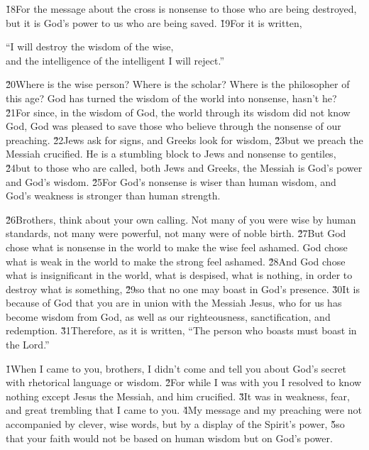 \v{18}For the message about the cross is nonsense to those who are being destroyed, but it is God's power to us who are being saved. \v{19}For it is written,

\begin{poetry}
\poeml ``I will destroy the wisdom of the wise, \\
\poemll    and the intelligence of the intelligent I will reject.''
\end{poetry}

\v{20}Where is the wise person? Where is the scholar? Where is the philosopher of this age? God has turned the wisdom of the world into nonsense, hasn't he? \v{21}For since, in the wisdom of God, the world through its wisdom did not know God, God was pleased to save those who believe through the nonsense of our preaching. \v{22}Jews ask for signs, and Greeks look for wisdom, \v{23}but we preach the Messiah crucified. He is a stumbling block to Jews and nonsense to gentiles, \v{24}but to those who are called, both Jews and Greeks, the Messiah is God's power and God's wisdom. \v{25}For God's nonsense is wiser than human wisdom, and God's weakness is stronger than human strength.

\v{26}Brothers, think about your own calling. Not many of you were wise by human standards, not many were powerful, not many were of noble birth. \v{27}But God chose what is nonsense in the world to make the wise feel ashamed. God chose what is weak in the world to make the strong feel ashamed. \v{28}And God chose what is insignificant in the world, what is despised, what is nothing, in order to destroy what is something, \v{29}so that no one may boast in God's presence. \v{30}It is because of God that you are in union with the Messiah Jesus, who for us has become wisdom from God, as well as our righteousness, sanctification, and redemption. \v{31}Therefore, as it is written, ``The person who boasts must boast in the Lord.''

\v{1}When I came to you, brothers, I didn't come and tell you about God's secret with rhetorical language or wisdom. \v{2}For while I was with you I resolved to know nothing except Jesus the Messiah, and him crucified. \v{3}It was in weakness, fear, and great trembling that I came to you. \v{4}My message and my preaching were not accompanied by clever, wise words, but by a display of the Spirit's power, \v{5}so that your faith would not be based on human wisdom but on God's power.


